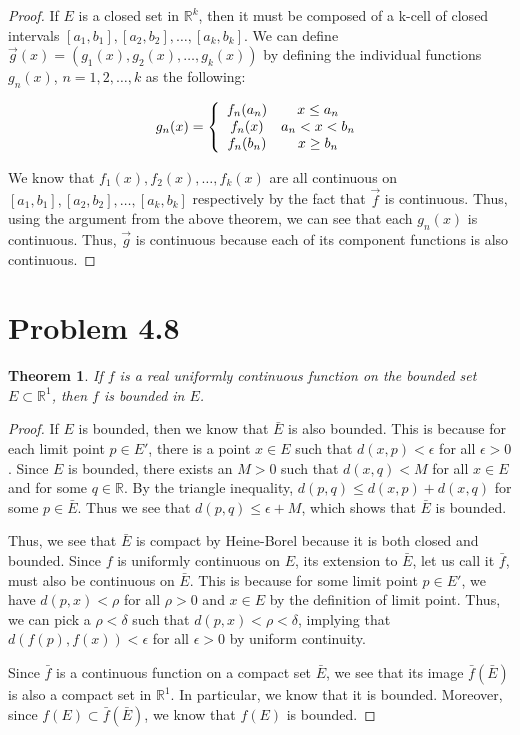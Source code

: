 \documentclass[psamsfonts]{amsart}
\newtheorem{thm}{Theorem}[section]
\theoremstyle{definition}
\theoremstyle{remark}
\numberwithin{equation}{section}
\begin{document}
\begin{proof}
If $E$ is a closed set in $\mathbb{R}^k$, then it must be composed of a k-cell of closed intervals $[a_1,b_1],[a_2,b_2],\ldots,[a_k,b_k]$. We can define $\vec{g}(x) = (g_1(x), g_2(x), \ldots, g_k(x))$ by defining the individual functions $g_n(x)$, $n = 1,2, \ldots, k$ as the following:

\begin{equation}
g_n(x) = \left\{ \begin{array}{c c}
f_n(a_n) & x \leq a_n \\
f_n(x) & a_n < x < b_n \\
f_n(b_n) & x \geq b_n 
\end{array} \right.
\end{equation}

We know that $f_1(x), f_2(x), \ldots, f_k(x)$ are all continuous on $[a_1,b_1],[a_2,b_2],\ldots,[a_k,b_k]$ respectively by the fact that $\vec{f}$ is continuous. Thus, using the argument from the above theorem, we can see that each $g_n(x)$ is continuous. Thus, $\vec{g}$ is continuous because each of its component functions is also continuous.
\end{proof}

\section{Problem 4.8}

\begin{thm}
If $f$ is a real uniformly continuous function on the bounded set $E \subset \mathbb{R}^1$, then $f$ is bounded in $E$.
\end{thm}

\begin{proof}
If $E$ is bounded, then we know that $\bar{E}$ is also bounded. This is because for each limit point $p \in E'$, there is a point $x \in E$ such that $d(x,p) < \epsilon$ for all $\epsilon > 0$. Since $E$ is bounded, there exists an $M>0$ such that $d(x,q) < M$ for all $x \in E$ and for some $q \in \mathbb{R}$. By the triangle inequality, $d(p,q) \leq d(x,p) + d(x,q)$ for some $p \in \bar{E}$. Thus we see that $d(p,q) \leq \epsilon + M$, which shows that $\bar{E}$ is bounded. 

Thus, we see that $\bar{E}$ is compact by Heine-Borel because it is both closed and bounded. Since $f$ is uniformly continuous on $E$, its extension to $\bar{E}$, let us call it $\bar{f}$, must also be continuous on $\bar{E}$. This is because for some limit point $p \in E'$, we have $d(p,x) < \rho$ for all $\rho > 0$ and $x \in E$ by the definition of limit point. Thus, we can pick a $\rho < \delta$ such that $d(p,x) < \rho < \delta$, implying that $d(f(p),f(x)) < \epsilon$ for all $\epsilon > 0$ by uniform continuity. 

Since $\bar{f}$ is a continuous function on a compact set $\bar{E}$, we see that its image $\bar{f}(\bar{E})$ is also a compact set in $\mathbb{R}^1$. In particular, we know that it is bounded. Moreover, since $f(E) \subset \bar{f}(\bar{E})$, we know that $f(E)$ is bounded. 
\end{proof}
\end{document}
